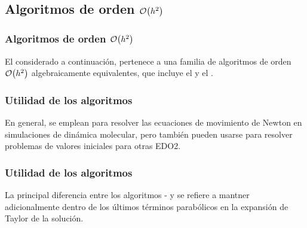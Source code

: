 \subsection{Algoritmos de orden \texorpdfstring{$\order{h^{2}}$}{}}
\begin{frame}
\frametitle{Algoritmos de orden $\order{h^{2}}$}
El  considerado a continuación, pertenece a una familia de algoritmos de orden $\order{h^{2}}$ algebraicamente equivalentes, que incluye el  y el .
\end{frame}
\begin{frame}
\frametitle{Utilidad de los algoritmos}
En general, se emplean para resolver las ecuaciones de movimiento de Newton en simulaciones de dinámica molecular, pero también pueden usarse para resolver problemas de valores iniciales para otras EDO2.
\end{frame}
\begin{frame}
\frametitle{Utilidad de los algoritmos}
La principal diferencia entre los algoritmos  -  y  se refiere a mantner adicionalmente dentro de los últimos términos parabólicos en la expansión de Taylor de la solución.
\end{frame}
